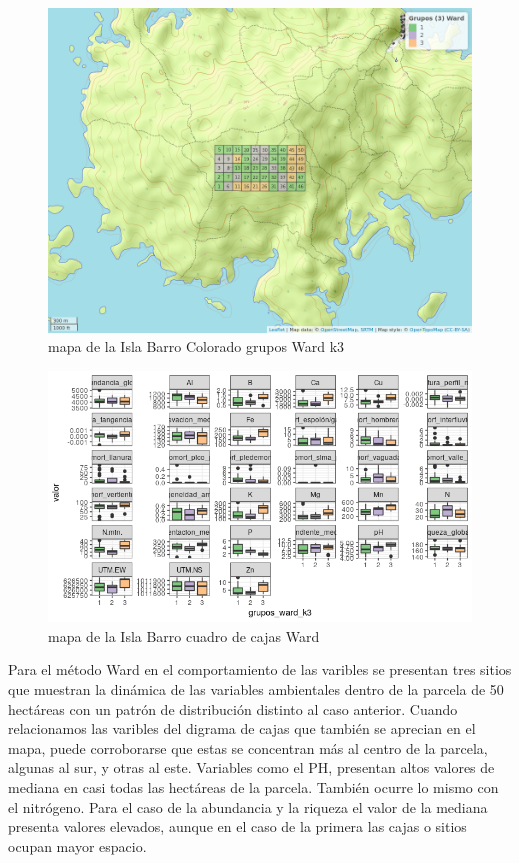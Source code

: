 \documentclass[11pt,]{article}
\begin{document}
\begin{figure}
\centering
\includegraphics[width=1.00000\textwidth]{mapa_ward_k3.png}
\caption{mapa de la Isla Barro Colorado grupos Ward k3
\label{fig:bci_map}}
\end{figure}

\begin{figure}
\centering
\includegraphics[width=1.00000\textwidth]{cuadro_cajas_ward.png}
\caption{mapa de la Isla Barro cuadro de cajas Ward \label{fig:bci_map}}
\end{figure}

Para el método Ward en el comportamiento de las varibles se presentan
tres sitios que muestran la dinámica de las variables ambientales dentro
de la parcela de 50 hectáreas con un patrón de distribución distinto al
caso anterior. Cuando relacionamos las varibles del digrama de cajas que
también se aprecian en el mapa, puede corroborarse que estas se
concentran más al centro de la parcela, algunas al sur, y otras al este.
Variables como el PH, presentan altos valores de mediana en casi todas
las hectáreas de la parcela. También ocurre lo mismo con el nitrógeno.
Para el caso de la abundancia y la riqueza el valor de la mediana
presenta valores elevados, aunque en el caso de la primera las cajas o
sitios ocupan mayor espacio.
\end{document}
